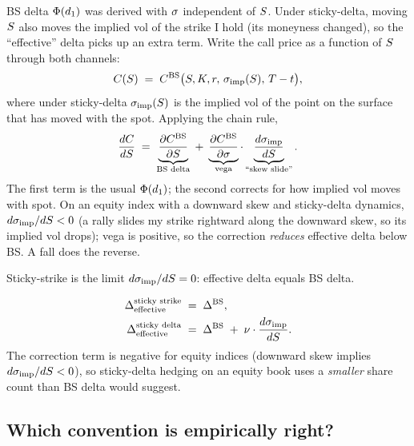 BS delta $\Phi(d_1)$ was derived with $\sigma$ independent of
$S$. Under sticky-delta, moving $S$ also moves the implied
vol of the strike I hold (its moneyness changed), so the
``effective'' delta picks up an extra term. Write the call price
as a function of $S$ through both channels:
\begin{equation*}
  C(S) \;=\; C^{\text{BS}}\bigl(S, K, r,\,
                   \sigma_{\text{imp}}(S),\,T - t\bigr),
\end{equation*}
where under sticky-delta $\sigma_{\text{imp}}(S)$ is the
implied vol of the point on the surface that has moved with the
spot. Applying the chain rule,
\begin{equation}
  \frac{dC}{dS} \;=\;
    \underbrace{\frac{\partial C^{\text{BS}}}{\partial S}}_{\text{BS delta}}
    \;+\; \underbrace{\frac{\partial C^{\text{BS}}}{\partial \sigma}}_{\text{vega}}
          \cdot
          \underbrace{\frac{d\sigma_{\text{imp}}}{dS}}_{\text{``skew slide''}}.
  \label{eq:sticky_delta_effective}
\end{equation}
The first term is the usual $\Phi(d_1)$; the second corrects for
how implied vol moves with spot. On an equity index with a downward
skew and sticky-delta dynamics, $d\sigma_{\text{imp}}/dS < 0$
(a rally slides my strike rightward along the downward skew, so
its implied vol drops); vega is positive, so the correction
\emph{reduces} effective delta below BS. A fall does the reverse.

Sticky-strike is the limit $d\sigma_{\text{imp}}/dS = 0$:
effective delta equals BS delta.

\begin{keyfactbox}
\begin{align*}
  \Delta_{\text{effective}}^{\text{sticky strike}} \;&=\; \Delta^{\text{BS}}, \\
  \Delta_{\text{effective}}^{\text{sticky delta}}  \;&=\; \Delta^{\text{BS}}
        \;+\; \nu \cdot \frac{d\sigma_{\text{imp}}}{dS}.
\end{align*}
The correction term is negative for equity indices (downward
skew implies $d\sigma_{\text{imp}}/dS < 0$), so sticky-delta
hedging on an equity book uses a \emph{smaller} share count than
BS delta would suggest.
\end{keyfactbox}

\subsection{Which convention is empirically right?}
\label{subsec:ch17_convention_choice}

